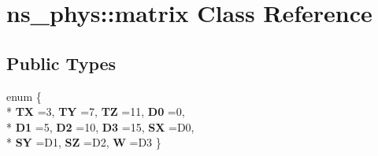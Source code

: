 \hypertarget{classns__phys_1_1matrix}{}\section{ns\+\_\+phys\+:\+:matrix Class Reference}
\label{classns__phys_1_1matrix}
\subsection*{Public Types}
\begin{DoxyCompactItemize}
\item 
enum \{ \\*
{\bfseries TX} =3, 
{\bfseries TY} =7, 
{\bfseries TZ} =11, 
{\bfseries D0} =0, 
\\*
{\bfseries D1} =5, 
{\bfseries D2} =10, 
{\bfseries D3} =15, 
{\bfseries SX} =D0, 
\\*
{\bfseries SY} =D1, 
{\bfseries SZ} =D2, 
{\bfseries W} =D3
 \}\hypertarget{classns__phys_1_1matrix_a6737e3f786039d494a0f48b48f6cb882}{}\label{classns__phys_1_1matrix_a6737e3f786039d494a0f48b48f6cb882}

\end{DoxyCompactItemize}
